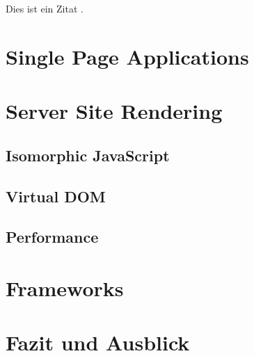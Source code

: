 \documentclass[runningheads]{llncs}
\begin{document}
Dies ist ein Zitat \cite{becker2008a}.


\section{Single Page Applications}
\label{sec:Single Page Applications}


\section{Server Site Rendering}
\label{sec:Server Site Rendering}

\subsection{Isomorphic JavaScript}
\label{subsec:Isomorphic JavaScript}

\subsection{Virtual DOM}
\label{subsec:Virtual DOM}

\subsection{Performance}
\label{subsec:Virtual DOM}

\section{Frameworks}
\label{sec:Evaluation}



\section{Fazit und Ausblick}
\label{sec:Fazit}



%

\newpage

\end{document}
